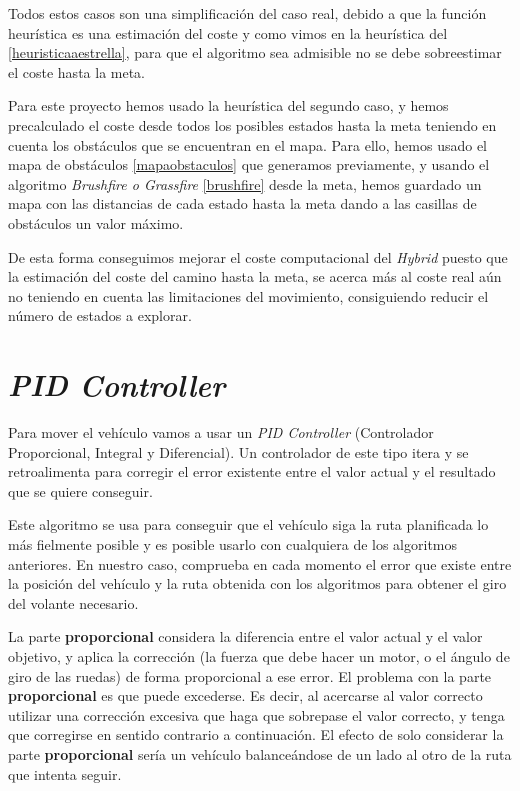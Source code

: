 Todos estos casos son una simplificación del caso real, debido a que la función heurística es una estimación del coste y como vimos en la heurística del \Astar \ref{heuristicaaestrella}, para que el algoritmo sea admisible no se debe sobreestimar el coste hasta la meta.

Para este proyecto hemos usado la heurística del segundo caso, y hemos precalculado el coste desde todos los posibles estados hasta la meta teniendo en cuenta los obstáculos que se encuentran en el mapa. Para ello, hemos usado el mapa de obstáculos \ref{mapaobstaculos} que generamos previamente, y usando el algoritmo \textit{Brushfire o Grassfire} \ref{brushfire} desde la meta, hemos guardado un mapa con las distancias de cada estado hasta la meta dando a las casillas de obstáculos un valor máximo.

De esta forma conseguimos mejorar el coste computacional del \textit{Hybrid \Astar} puesto que la estimación del coste del camino hasta la meta, se acerca más al coste real aún no teniendo en cuenta las limitaciones del movimiento, consiguiendo reducir el número de estados a explorar.

\section{\textit{PID Controller}}\label{pidcontroller}
Para mover el vehículo vamos a usar un \textit{PID Controller} (Controlador Proporcional, Integral y Diferencial). Un controlador de este tipo itera y se retroalimenta para corregir el error existente entre el valor actual y el resultado que se quiere conseguir.

Este algoritmo se usa para conseguir que el vehículo siga la ruta planificada lo más fielmente posible y es posible usarlo con cualquiera de los algoritmos anteriores. En nuestro caso, comprueba en cada momento el error que existe entre la posición del vehículo y la ruta obtenida con los algoritmos para obtener el giro del volante necesario.

La parte \textbf{proporcional} considera la diferencia entre el valor actual y el valor objetivo, y aplica la corrección (la fuerza que debe hacer un motor, o el ángulo de giro de las ruedas) de forma proporcional a ese error. El problema con la parte \textbf{proporcional} es que puede excederse. Es decir, al acercarse al valor correcto utilizar una corrección excesiva que haga que sobrepase el valor correcto, y tenga que corregirse en sentido contrario a continuación. El efecto de solo considerar la parte \textbf{proporcional} sería un vehículo balanceándose de un lado al otro de la ruta que intenta seguir.

